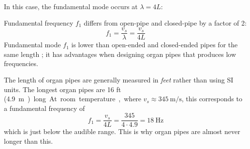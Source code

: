 In this case, the fundamental mode occurs at $\lambda=4L$:
\begin{figure}[ht]
  \centering
\end{figure}
Fundamental frequency $f_1$ differs from open-pipe and closed-pipe by a factor
of 2:
\begin{equation}
  \boxed{f_1=\frac{v_s}\lambda=\frac{v_s}{4L}}
\end{equation}
Fundamental mode $f_1$ is lower than open-ended and closed-ended pipes for the
same length ; it has advantages when designing organ pipes that produces low
frequencies.

\begin{remark}
  The length of organ pipes are generally measured in \emph{feet} rather than
  using SI units. The longest organ pipes are 16 ft (\SI{4.9}\metre) long. At
  room temperature, where $v_s\approx\SI{345}{\metre\per\second}$, this
  corresponds to a fundamental frequency of
  \begin{equation*}
    f_1=\frac{v_s}{4L}=\frac{345}{4\cdot4.9}=\SI{18}\hertz
  \end{equation*}
  which is just below the audible range. This is why organ pipes are almost
  never longer than this.
  \begin{center}
  \end{center}
\end{remark} 


